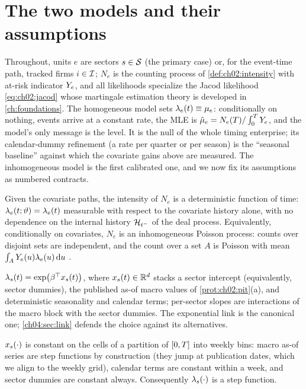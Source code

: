 \section{The two models and their assumptions}\label{ch04:sec:models}

Throughout, units $e$ are sectors $s \in \mathcal{S}$ (the primary case) or,
for the event-time path, tracked firms $i \in \mathcal{I}$; $N_e$ is the
counting process of \cref{def:ch02:intensity} with at-risk indicator
$Y_e$, and all likelihoods specialize the Jacod likelihood
\cref{eq:ch02:jacod} whose martingale estimation theory is developed in
\cref{ch:foundations}. The homogeneous model sets $\lambda_e(t) \equiv \mu_e$:
conditionally on nothing, events arrive at a constant rate, the MLE is
$\hat{\mu}_e = N_e(T) / \int_0^{T}Y_e$, and the model's only
message is the level. It is the null of the whole timing enterprise; its
calendar-dummy refinement (a rate per quarter or per season) is the
``seasonal baseline'' against which the covariate gains above are measured.
The inhomogeneous model is the first calibrated one, and we now fix its
assumptions as numbered contracts.

\begin{assumption}\label{asm:ch04:condpoisson}
Given the covariate paths, the intensity of $N_e$ is a deterministic
function of time: $\lambda_e(t;\vartheta) = \lambda_e(t)$ measurable with
respect to the covariate history alone, with no dependence on the internal
history $\mathcal{H}_{t^-}$ of the deal process. Equivalently, conditionally on
covariates, $N_e$ is an inhomogeneous Poisson process: counts over disjoint
sets are independent, and the count over a set $A$ is Poisson with mean
$\int_A Y_e(u)\lambda_e(u)\,\mathrm{d} u$ \citep{kingman1993,daley2003}.
\end{assumption}

\begin{assumption}\label{asm:ch04:loglin}
$\lambda_s(t) = \exp\!\big(\beta^{\top} x_s(t)\big)$, where $x_s(t) \in
\mathbb{R}^{d}$ stacks a sector intercept (equivalently, sector dummies), the
published as-of macro values of \cref{prot:ch02:pit}(a), and deterministic
seasonality and calendar terms; per-sector slopes are interactions of the
macro block with the sector dummies. The exponential link is the canonical
one; \cref{ch04:sec:link} defends the choice against its alternatives.
\end{assumption}

\begin{assumption}\label{asm:ch04:pwconst}
$x_s(\cdot)$ is constant on the cells of a partition of $[0,T]$
into weekly bins: macro as-of series are step functions by construction
(they jump at publication dates, which we align to the weekly grid),
calendar terms are constant within a week, and sector dummies are constant
always. Consequently $\lambda_s(\cdot)$ is a step function.
\end{assumption}

